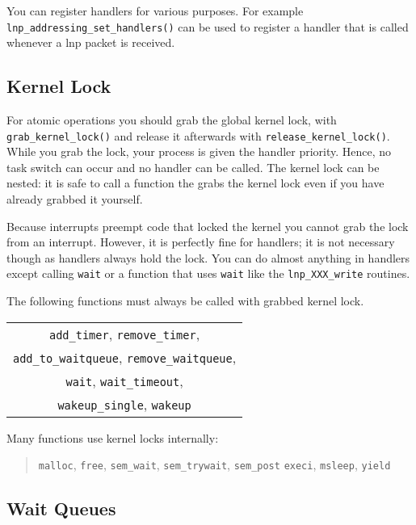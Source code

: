\documentclass[twocolumn]{article}
\begin{document}
  You can register handlers for various purposes.  For example
  \verb|lnp_addressing_set_handlers()| can be used to register
  a handler that is called whenever a lnp packet is received.  

  \subsection{Kernel Lock}

  For atomic operations you should grab the global kernel lock, with
  \verb|grab_kernel_lock()| and release it afterwards with
  \verb|release_kernel_lock()|.  While you grab the lock, your process is
  given the handler priority.  Hence, no task switch can occur and no handler
  can be called.  The kernel lock can be nested: it is safe to call a function
  the grabs the kernel lock even if you have already grabbed it yourself.

  Because interrupts preempt code that locked the kernel you cannot grab the
  lock from an interrupt.  However, it is perfectly fine for handlers; it is
  not necessary though as handlers always hold the lock.  You can do almost
  anything in handlers except calling \verb|wait| or a function that uses
  \verb|wait| like the \verb|lnp_XXX_write| routines.

  The following functions must always be called with grabbed kernel lock.

  \begin{center}
  \begin{tabular}{|c|}
    \hline
    \verb|add_timer|, \verb|remove_timer|,  \\
    \verb|add_to_waitqueue|, \verb|remove_waitqueue|, \\
    \verb|wait|, \verb|wait_timeout|, \\
    \verb|wakeup_single|, \verb|wakeup|\\
    \hline
  \end{tabular}
  \end{center}
  
  Many functions use kernel locks internally:
  \begin{quote}
    \verb|malloc|, \verb|free|,
    \verb|sem_wait|, \verb|sem_trywait|, \verb|sem_post|
    \verb|execi|, \verb|msleep|, \verb|yield|
  \end{quote}

  \subsection{Wait Queues}
\end{document}
